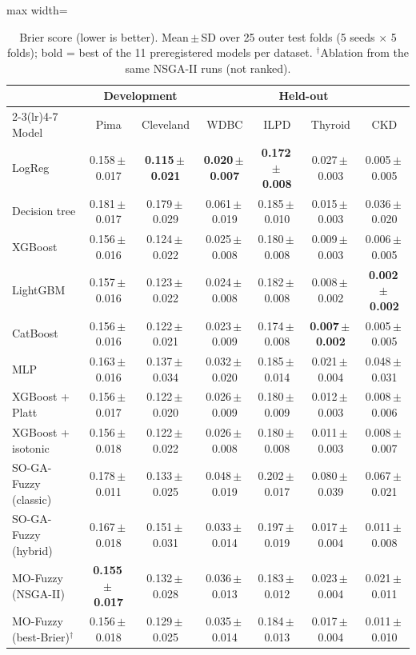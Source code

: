 \begin{table}[t]
\centering
\scriptsize
\setlength{\tabcolsep}{3pt}
\caption{Brier score (lower is better). Mean\,$\pm$\,SD over 25 outer test folds (5 seeds $\times$ 5 folds); bold = best of the 11 preregistered models per dataset. $^\dagger$Ablation from the same NSGA-II runs (not ranked).}
\label{tab:brier}
\begin{adjustbox}{max width=\linewidth}
\begin{tabular}{lcccccc}
\toprule
 & \multicolumn{2}{c}{Development} & \multicolumn{4}{c}{Held-out} \\
\cmidrule(lr){2-3}\cmidrule(lr){4-7}
Model & Pima & Cleveland & WDBC & ILPD & Thyroid & CKD \\
\midrule
LogReg & 0.158\,$\pm$\,0.017 & \textbf{0.115\,$\pm$\,0.021} & \textbf{0.020\,$\pm$\,0.007} & \textbf{0.172\,$\pm$\,0.008} & 0.027\,$\pm$\,0.003 & 0.005\,$\pm$\,0.005 \\
Decision tree & 0.181\,$\pm$\,0.017 & 0.179\,$\pm$\,0.029 & 0.061\,$\pm$\,0.019 & 0.185\,$\pm$\,0.010 & 0.015\,$\pm$\,0.003 & 0.036\,$\pm$\,0.020 \\
XGBoost & 0.156\,$\pm$\,0.016 & 0.124\,$\pm$\,0.022 & 0.025\,$\pm$\,0.008 & 0.180\,$\pm$\,0.008 & 0.009\,$\pm$\,0.003 & 0.006\,$\pm$\,0.005 \\
LightGBM & 0.157\,$\pm$\,0.016 & 0.123\,$\pm$\,0.022 & 0.024\,$\pm$\,0.008 & 0.182\,$\pm$\,0.008 & 0.008\,$\pm$\,0.002 & \textbf{0.002\,$\pm$\,0.002} \\
CatBoost & 0.156\,$\pm$\,0.016 & 0.122\,$\pm$\,0.021 & 0.023\,$\pm$\,0.009 & 0.174\,$\pm$\,0.008 & \textbf{0.007\,$\pm$\,0.002} & 0.005\,$\pm$\,0.005 \\
MLP & 0.163\,$\pm$\,0.016 & 0.137\,$\pm$\,0.034 & 0.032\,$\pm$\,0.020 & 0.185\,$\pm$\,0.014 & 0.021\,$\pm$\,0.004 & 0.048\,$\pm$\,0.031 \\
XGBoost + Platt & 0.156\,$\pm$\,0.017 & 0.122\,$\pm$\,0.020 & 0.026\,$\pm$\,0.009 & 0.180\,$\pm$\,0.009 & 0.012\,$\pm$\,0.003 & 0.008\,$\pm$\,0.006 \\
XGBoost + isotonic & 0.156\,$\pm$\,0.018 & 0.122\,$\pm$\,0.022 & 0.026\,$\pm$\,0.008 & 0.180\,$\pm$\,0.008 & 0.011\,$\pm$\,0.003 & 0.008\,$\pm$\,0.007 \\
SO-GA-Fuzzy (classic) & 0.178\,$\pm$\,0.011 & 0.133\,$\pm$\,0.025 & 0.048\,$\pm$\,0.019 & 0.202\,$\pm$\,0.017 & 0.080\,$\pm$\,0.039 & 0.067\,$\pm$\,0.021 \\
SO-GA-Fuzzy (hybrid) & 0.167\,$\pm$\,0.018 & 0.151\,$\pm$\,0.031 & 0.033\,$\pm$\,0.014 & 0.197\,$\pm$\,0.019 & 0.017\,$\pm$\,0.004 & 0.011\,$\pm$\,0.008 \\
MO-Fuzzy (NSGA-II) & \textbf{0.155\,$\pm$\,0.017} & 0.132\,$\pm$\,0.028 & 0.036\,$\pm$\,0.013 & 0.183\,$\pm$\,0.012 & 0.023\,$\pm$\,0.004 & 0.021\,$\pm$\,0.011 \\
\midrule
MO-Fuzzy (best-Brier)$^\dagger$ & 0.156\,$\pm$\,0.018 & 0.129\,$\pm$\,0.025 & 0.035\,$\pm$\,0.014 & 0.184\,$\pm$\,0.013 & 0.017\,$\pm$\,0.004 & 0.011\,$\pm$\,0.010 \\
\bottomrule
\end{tabular}
\end{adjustbox}
\end{table}
